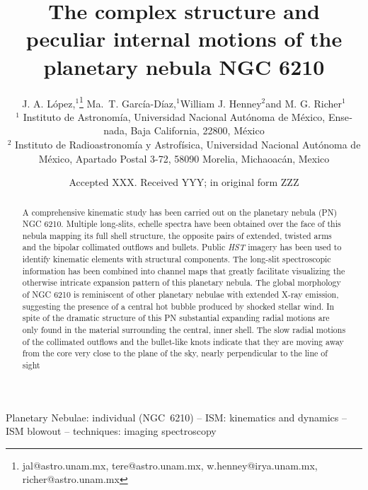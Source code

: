 \documentclass[useAMS, usenatbib]{mnras}
\title{The complex structure and peculiar internal motions of the planetary nebula NGC 6210}
\author[López et al.]{
  J. A. López,\(^1\)\thanks{
    jal@astro.unam.mx,
    tere@astro.unam.mx,
    w.henney@irya.unam.mx,
    richer@astro.unam.mx
  }
  Ma.\ T. García-Díaz,\(^1\)\footnotemark[1]
  William J. Henney\(^2\)\footnotemark[1]
  and M. G. Richer\(^1\)\footnotemark[1]
  \\
  \(^1\)\foreignlanguage{spanish}{
    Instituto de Astronomía,
    Universidad Nacional Autónoma de México,
    Ensenada, Baja California, 22800, México}
  \\
  \(^2\)\foreignlanguage{spanish}{
    Instituto de Radioastronomía y
    Astrofísica, Universidad Nacional Autónoma de México, Apartado
    Postal 3-72, 58090 Morelia, Michaoacán, Mexico}
}
\date{Accepted XXX. Received YYY; in original form ZZZ}
\begin{document}
 
\label{firstpage}
\pagerange{\pageref{firstpage}--\pageref{lastpage}}
\maketitle

\begin{abstract}
  A comprehensive kinematic study has been carried out on the planetary nebula (PN) NGC 6210. Multiple long-slits, echelle spectra have been obtained over the face of this nebula mapping its full shell structure, the opposite pairs of extended, twisted arms and the bipolar collimated outflows and bullets. Public {\it HST} imagery has been used to identify kinematic elements with structural components. The long-slit spectroscopic information has been combined into channel maps that greatly facilitate visualizing the otherwise intricate expansion pattern of this  planetary nebula. The global morphology of NGC 6210 is  reminiscent of other planetary nebulae with extended X-ray emission, suggesting the presence of a central hot bubble produced by shocked stellar wind. In spite of the dramatic structure of this PN substantial expanding radial motions are only found in the material surrounding the central, inner shell. The slow radial motions of the collimated outflows and the bullet-like knots indicate that they are  moving away from the core very close to the plane of the sky, nearly perpendicular to the line of sight
\end{abstract}


\begin{keywords}
  Planetary Nebulae: individual (NGC~6210)
  -- ISM: kinematics and dynamics -- ISM blowout
  -- techniques: imaging spectroscopy
\end{keywords}

\maketitle
\end{document}
